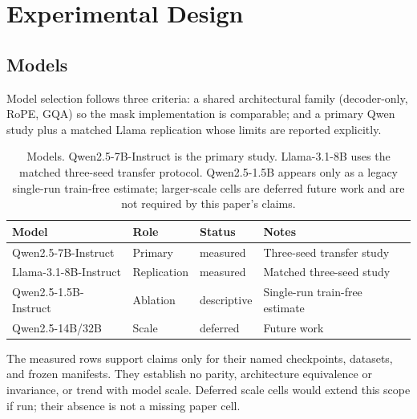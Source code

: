 \section{Experimental Design}
\label{sec:design}

\subsection{Models}
\label{sec:design-models}

Model selection follows three criteria: a shared architectural family
(decoder-only, RoPE, GQA) so the mask implementation is comparable; and a
primary Qwen study plus a matched Llama replication whose limits are reported
explicitly.

\begin{table}[t]
\centering
\caption{Models. Qwen2.5-7B-Instruct is the primary study. Llama-3.1-8B uses
    the matched three-seed transfer protocol. Qwen2.5-1.5B appears only as a
    legacy single-run train-free estimate; larger-scale cells are deferred
    future work and are not required by this paper's claims.}
\label{tab:models}
\begin{tabular}{@{}llll@{}}
\toprule
Model & Role & Status & Notes \\
\midrule
Qwen2.5-7B-Instruct     & Primary   & measured   & Three-seed transfer study \\
Llama-3.1-8B-Instruct   & Replication & measured & Matched three-seed study \\
Qwen2.5-1.5B-Instruct   & Ablation & descriptive    & Single-run train-free estimate \\
Qwen2.5-14B/32B         & Scale     & deferred       & Future work \\
\bottomrule
\end{tabular}
\end{table}

The measured rows support claims only for their named checkpoints, datasets,
and frozen manifests. They establish no parity, architecture equivalence or
invariance, or trend with model scale. Deferred scale cells would extend this
scope if run; their absence is not a missing paper cell.

